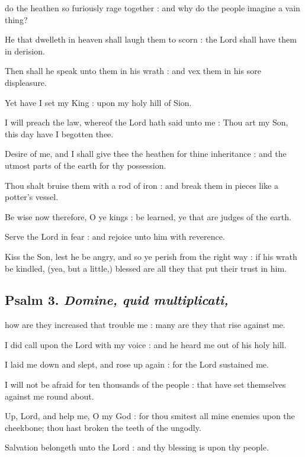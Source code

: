  do the heathen so furiously rage together : and why do the people imagine a vain thing?\par
{}
He that dwelleth in heaven shall laugh them to scorn : the Lord shall have them in derision.\par
{}Then shall he speak unto them in his wrath : and vex them in his sore displeasure.\par
{}Yet have I set my King : upon my holy hill of Sion.\par
{}I will preach the law, whereof the Lord hath said unto me : Thou art my Son, this day have I begotten thee.\par
{}Desire of me, and I shall give thee the heathen for thine inheritance : and the utmost parts of the earth for thy possession.\par
{}Thou shalt bruise them with a rod of iron : and break them in pieces like a potter's vessel.\par
{}Be wise now therefore, O ye kings : be learned, ye that are judges of the earth.\par
{}Serve the Lord in fear : and rejoice unto him with reverence.\par
{}Kiss the Son, lest he be angry, and so ye perish from the right way : if his wrath be kindled, (yea, but a little,) blessed are all they that put their trust in him.\par

\subsection{Psalm 3. \textit{Domine, quid multiplicati,}}

 how are they increased that trouble me : many are they that rise against me.\par
{}
I did call upon the Lord with my voice : and he heard me out of his holy hill.\par
{}I laid me down and slept, and rose up again : for the Lord sustained me.\par
{}I will not be afraid for ten thousands of the people : that have set themselves against me round about.\par
{}Up, Lord, and help me, O my God : for thou smitest all mine enemies upon the cheekbone; thou hast broken the teeth of the ungodly.\par
{}Salvation belongeth unto the Lord : and thy blessing is upon thy people.\par

